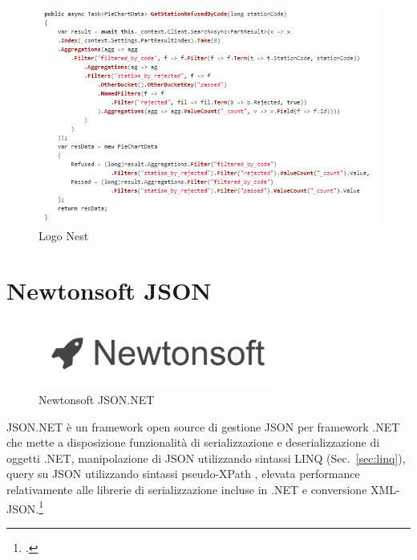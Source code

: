 \begin{figure}[ht!]
\begin{center}
  \includegraphics[width=12cm]{images/NestQuery.PNG}
  \caption{Logo Nest}
  \label{fig:nest}
\end{center}
\end{figure}

\section{Newtonsoft JSON}
\begin{figure}[ht!]
\begin{center}
  \includegraphics[width=8cm]{images/newtonsoft.png}
  \caption{Newtonsoft JSON.NET}
  \label{fig:newtonsoft}
\end{center}
\end{figure}
JSON.NET è un framework open source di gestione JSON per framework .NET che mette a disposizione funzionalità di serializzazione e deserializzazione di oggetti .NET, manipolazione di JSON utilizzando sintassi LINQ (Sec.~\ref{sec:linq}), query su JSON utilizzando sintassi pseudo-XPath \cite{XPATH}, elevata performance relativamente alle librerie di serializzazione incluse in .NET e conversione XML-JSON.\footcite{NEWTONSOFT}

